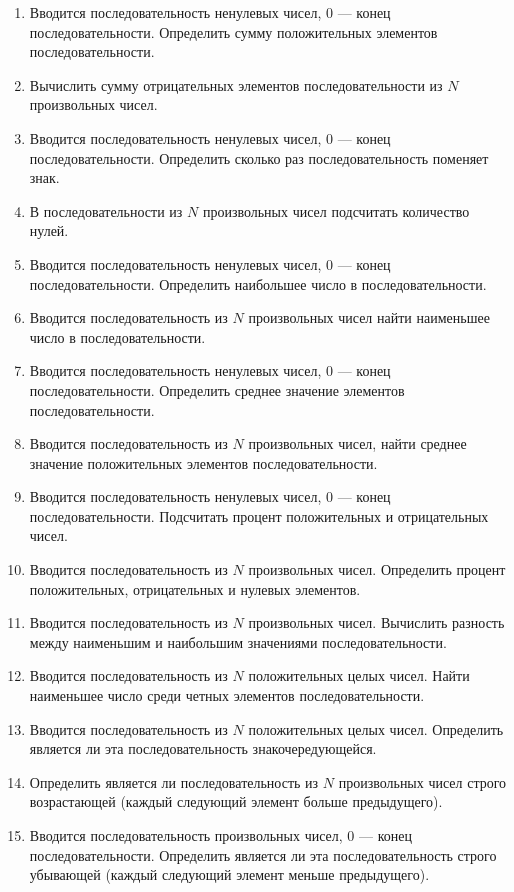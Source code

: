 \begin{enumerate}
\item Вводится последовательность ненулевых чисел, 0 --- конец последовательности. Определить сумму положительных
элементов последовательности.
\item Вычислить сумму отрицательных элементов последовательности из $N$ произвольных чисел.
\item Вводится последовательность ненулевых чисел, 0 --- конец последовательности. Определить сколько раз
последовательность поменяет знак.
\item В последовательности из $N$ произвольных чисел подсчитать количество нулей.
\item Вводится последовательность ненулевых чисел, 0 --- конец последовательности. Определить наибольшее число в
последовательности.
\item Вводится последовательность из $N$ произвольных чисел найти наименьшее число в
последовательности.
\item Вводится последовательность ненулевых чисел, 0 --- конец последовательности. Определить среднее значение элементов
последовательности.
\item Вводится последовательность из $N$ произвольных чисел, найти среднее значение положительных
элементов последовательности.
\item Вводится последовательность ненулевых чисел, 0 --- конец последовательности. Подсчитать процент положительных и
отрицательных чисел.
\item Вводится последовательность из $N$ произвольных чисел. Определить процент положительных,
отрицательных и нулевых элементов. 
\item Вводится последовательность из $N$ произвольных чисел. Вычислить разность между наименьшим и
наибольшим значениями последовательности.
\item Вводится последовательность из $N$ положительных целых чисел. Найти наименьшее число среди
четных элементов последовательности.
\item Вводится последовательность из $N$ положительных целых чисел. Определить является ли эта
последовательность знакочередующейся.
\item Определить является ли последовательность из $N$ произвольных чисел строго возрастающей (каждый
следующий элемент больше предыдущего).
\item Вводится последовательность произвольных чисел, 0 --- конец последовательности. Определить является ли эта
последовательность строго убывающей (каждый следующий элемент меньше предыдущего).

\end{enumerate}
